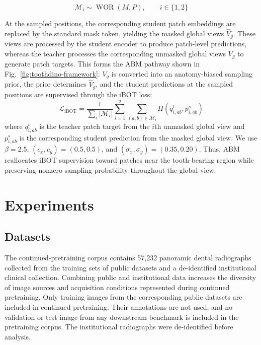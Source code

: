 \documentclass[conference]{IEEEtran}
\newcommand{\ABM}{\textsc{ABM}}
\begin{document}
\begin{equation}
\label{eq:mask-prior-wor}
\mathcal{M}_i
\sim
\operatorname{WOR}
\left(
M,P
\right),
\qquad
i\in\{1,2\}
\end{equation}

At the sampled positions, the corresponding student patch embeddings
are replaced by the standard mask token, yielding the masked global
views $\widehat{V}_g$. These views are processed by the student encoder
to produce patch-level predictions, whereas the teacher processes the
corresponding unmasked global views $V_g$ to generate patch targets.
This forms the ABM pathway shown in
Fig.~\ref{fig:toothdino-framework}:
$V_g$ is converted into an anatomy-biased sampling prior, the prior
determines $\widehat{V}_g$, and the student predictions at the sampled
positions are supervised through the iBOT loss:
\begin{equation}
\label{eq:ibot-masked-positions}
\mathcal{L}_{\mathrm{iBOT}}
=
\frac{1}{\sum_i|\mathcal{M}_i|}
\sum_{i=1}^{2}
\sum_{(a,b)\in\mathcal{M}_i}
H\left(q^t_{i,ab},p^s_{i,ab}\right)
\end{equation}
where $q^t_{i,ab}$ is the teacher patch target from the $i$th unmasked
global view and $p^s_{i,ab}$ is the corresponding student prediction
from the masked global view. We use $\beta=2.5$,
$(c_x,c_y)=(0.5,0.5)$, and
$(\sigma_x,\sigma_y)=(0.35,0.20)$. Thus, \ABM{} reallocates iBOT
supervision toward patches near the tooth-bearing region while
preserving nonzero sampling probability throughout the global view.






\section{Experiments}
\label{sec:experiments}

\subsection{Datasets}
\label{sec:datasets}

The continued-pretraining corpus contains 57,232 panoramic dental radiographs collected from the training sets of public datasets and a de-identified institutional clinical collection. Combining public and institutional data increases the diversity of image sources and acquisition conditions represented during continued pretraining. Only training images from the corresponding public datasets are included in continued pretraining. Their annotations are not used, and no validation or test image from any downstream benchmark is included in the pretraining corpus. The institutional radiographs were de-identified before analysis. %
\end{document}
